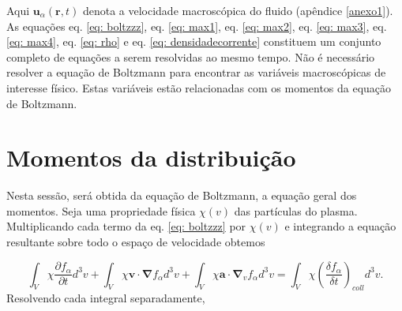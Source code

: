 \documentclass[12pt,oneside,a4paper]{abntex2}
\begin{document}
Aqui $ \bm{u}_\alpha(\bm{r},t)$ denota a velocidade macroscópica do fluido (apêndice \ref{anexo1}). As equações eq. \ref{eq: boltzzz}, eq. \ref{eq: max1}, eq. \ref{eq: max2}, eq. \ref{eq: max3}, eq. \ref{eq: max4}, eq. \ref{eq: rho} e eq. \ref{eq: densidadecorrente} constituem um conjunto completo de equações a serem resolvidas ao mesmo tempo. %
Não é necessário resolver a equação de Boltzmann para encontrar as variáveis macroscópicas de interesse físico. Estas variáveis estão relacionadas com os momentos da equação de Boltzmann. %



\section{Momentos da distribuição}
\noindent Nesta sessão, será obtida da equação de Boltzmann, a equação geral dos momentos. 
Seja uma propriedade física $\chi(v)$ das partículas do plasma. Multiplicando cada termo da eq. \ref{eq: boltzzz} por $\chi(v)$ e integrando a equação resultante sobre todo o espaço de velocidade obtemos

\begin{equation}
\label{eq: pit3.01}
\int_V \chi \frac{\partial f_\alpha}{\partial t} d^3 v + \int_V \chi \bm{v} \cdot \bm{\nabla} f_\alpha d^3 v + \int_V \chi \bm{a} \cdot \bm{\nabla}_v f_\alpha d^3 v = \int_V \chi \left( \frac{\delta f_\alpha}{\delta t} \right)_{coll} d^3 v.
\end{equation}
Resolvendo cada integral separadamente,
\end{document}
